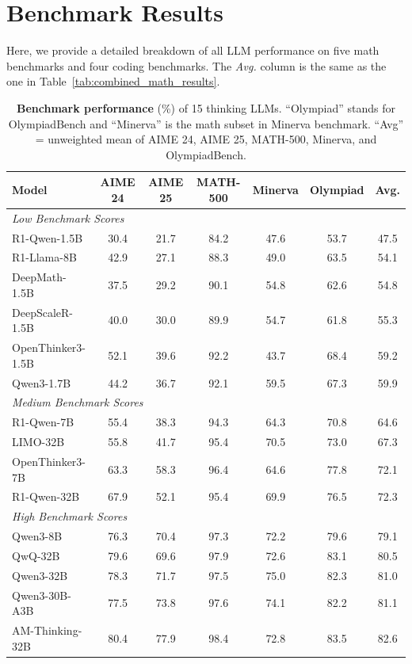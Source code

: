 \documentclass{article} %
\begin{document}
\section{Benchmark Results}
Here, we provide a detailed breakdown of all LLM performance on five math benchmarks and four coding benchmarks. The \textit{Avg.} column is the same as the one in Table~\ref{tab:combined_math_results}. 
\begin{table}[ht!]
  \centering
  \begin{tabular}{l*{6}{c}}
    \toprule
    \textbf{Model} &
    \textbf{AIME 24} &
    \textbf{AIME 25} &
    \textbf{MATH-500} &
    \textbf{Minerva} &
    \textbf{Olympiad} &
    \textbf{Avg.} \\
    \midrule
    \multicolumn{7}{l}{\textit{Low Benchmark Scores}} \\
    \midrule
    R1-Qwen-1.5B          & 30.4 & 21.7 & 84.2 & 47.6 & 53.7 & 47.5 \\
    R1-Llama-8B           & 42.9 & 27.1 & 88.3 & 49.0 & 63.5 & 54.1 \\
    DeepMath-1.5B                 & 37.5 & 29.2 & 90.1 & 54.8 & 62.6 & 54.8 \\
    DeepScaleR-1.5B               & 40.0 & 30.0 & 89.9 & 54.7 & 61.8 & 55.3 \\
    OpenThinker3-1.5B             & 52.1 & 39.6 & 92.2 & 43.7 & 68.4 & 59.2 \\
    Qwen3-1.7B                    & 44.2 & 36.7 & 92.1 & 59.5 & 67.3 & 59.9 \\
    \midrule
    \multicolumn{7}{l}{\textit{Medium Benchmark Scores}} \\
    \midrule
    R1-Qwen-7B            & 55.4 & 38.3 & 94.3 & 64.3 & 70.8 & 64.6 \\
    LIMO-32B                      & 55.8 & 41.7 & 95.4 & 70.5 & 73.0 & 67.3 \\
    OpenThinker3-7B               & 63.3 & 58.3 & 96.4 & 64.6 & 77.8 & 72.1 \\
    R1-Qwen-32B           & 67.9 & 52.1 & 95.4 & 69.9 & 76.5 & 72.3 \\
    \midrule
    \multicolumn{7}{l}{\textit{High Benchmark Scores}} \\
    \midrule
    Qwen3-8B                      & 76.3 & 70.4 & 97.3 & 72.2 & 79.6 & 79.1 \\
    QwQ-32B                       & 79.6 & 69.6 & 97.9 & 72.6 & 83.1 & 80.5 \\
    Qwen3-32B                     & 78.3 & 71.7 & 97.5 & 75.0 & 82.3 & 81.0 \\
    Qwen3-30B-A3B                 & 77.5 & 73.8 & 97.6 & 74.1 & 82.2 & 81.1 \\
    AM-Thinking-32B            & 80.4 & 77.9 & 98.4 & 72.8 & 83.5 & 82.6 \\
    \bottomrule
  \end{tabular}
  \caption{\textbf{Benchmark performance} (\%) of 15 thinking LLMs. ``Olympiad'' stands for OlympiadBench and ``Minerva'' is the math subset in Minerva benchmark. ``Avg'' = unweighted mean  of AIME 24, AIME 25, MATH-500, Minerva, and OlympiadBench.}
  \label{tab:full_benchmark_scores}
\end{table}
\end{document}
